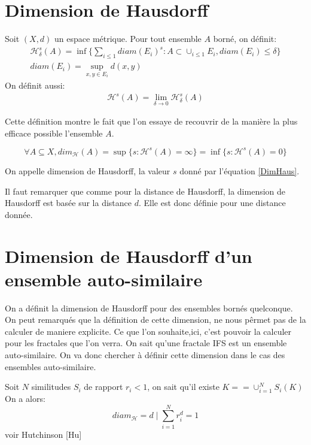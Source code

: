 \documentclass[a4paper, 12pt]{report}
\begin{document}
		\section{Dimension de Hausdorff}
			
			\begin{definition}
				Soit $(X,d)$ un espace métrique. Pour tout ensemble $A$ borné, on définit:
				\begin{align*}
					\mathscr{H}^s_\delta(A)=\inf\{\sum_{i\leq1}diam(E_i)^s:A\subset\cup_{i\leq1}E_i,diam(E_i)\leq\delta\}\\
					diam(E_i)=\sup_{x,y\in E_i}d(x,y)
					\end{align*}
				On définit aussi:
				\begin{align*}
					\mathscr{H}^s(A)=\lim_{\delta\rightarrow0}\mathscr{H}^s_\delta(A)
				\end{align*}
			\end{definition}
			\hspace{0.7 cm} Cette définition montre le fait que l'on essaye de recouvrir de la manière la plus efficace possible l'ensemble $A$.
			
			
			
			
			\begin{prop}
				\begin{equation}
				\label{DimHaus}
					\forall A\subseteq X, dim_\mathscr{H}(A)=\sup\{s:\mathscr{H}^s(A)=\infty\}=\inf\{s:\mathscr{H}^s(A)=0\}
				\end{equation}
			\end{prop}

			\begin{definition}
				On appelle dimension de Hausdorff, la valeur $s$ donné par l'équation \ref{DimHaus}.
			\end{definition}
			\begin{remark*}
				Il faut remarquer que comme pour la distance de Hausdorff, la dimension de Hausdorff est basée sur la distance $d$. Elle est donc définie pour une distance donnée.
			\end{remark*}
			
\newpage
		\section{Dimension de Hausdorff d'un ensemble auto-similaire}
			On a définit la dimension de Hausdorff pour des ensembles bornés quelconque. On peut remarqués que la définition de cette dimension, ne nous pêrmet pas de la calculer de maniere explicite. Ce que l'on souhaite,ici, c'est pouvoir la calculer pour les fractales que l'on verra. On sait qu'une fractale IFS est un ensemble auto-similaire. On va donc chercher à définir cette dimension dans le cas des ensembles auto-similaire.
			\begin{theorem}
				Soit $N$ similitudes $S_i$ de rapport $r_i<1$, on sait qu'il existe $K==\cup^N_{i=1}S_i(K)$
				On a alors:
				\begin{equation}
					diam_\mathscr{H}=d \mid \sum_{i=1}^N r_i^d=1
				\end{equation}
				voir Hutchinson [Hu]
			\end{theorem}
			
\end{document}
